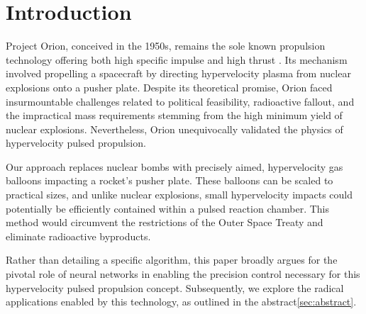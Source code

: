 \documentclass{article}
\begin{document}
\section{Introduction}
Project Orion, conceived in the 1950s, remains the sole known propulsion technology offering both high specific impulse and high thrust \cite{projorion}. Its mechanism involved propelling a spacecraft by directing hypervelocity plasma from nuclear explosions onto a pusher plate. Despite its theoretical promise, Orion faced insurmountable challenges related to political feasibility, radioactive fallout, and the impractical mass requirements stemming from the high minimum yield of nuclear explosions. Nevertheless, Orion unequivocally validated the physics of hypervelocity pulsed propulsion.

Our approach replaces nuclear bombs with precisely aimed, hypervelocity gas balloons impacting a rocket's pusher plate. These balloons can be scaled to practical sizes, and unlike nuclear explosions, small hypervelocity impacts could potentially be efficiently contained within a pulsed reaction chamber. This method would circumvent the restrictions of the Outer Space Treaty \cite{outer_space_treaty} and eliminate radioactive byproducts.

Rather than detailing a specific algorithm, this paper broadly argues for the pivotal role of neural networks in enabling the precision control necessary for this hypervelocity pulsed propulsion concept. Subsequently, we explore the radical applications enabled by this technology, as outlined in the abstract\ref{sec:abstract}.



  
  
\end{document}
